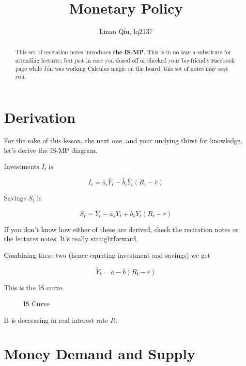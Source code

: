 \documentclass[11pt]{scrartcl}
\title{Monetary Policy}
\author{Linan Qiu, lq2137}
\newcommand{\jon}{J\'{o}n }
\newcommand{\og}{\ensuremath{\tilde{Y}}}
\begin{document}
\maketitle

\begin{abstract}
This set of recitation notes introduces \textbf{the IS-MP}. This is in no way a substitute for attending lectures, but just in case you dozed off or checked your boyfriend's Facebook page while \jon was working Calculus magic on the board, this set of notes may save you.
\end{abstract}

\section{Derivation}

For the sake of this lesson, the next one, and your undying thirst for knowledge, let's derive the IS-MP diagram.

Investments $I_t$ is

\[I_t = \bar{a}_i \bar{Y}_t - \bar{b}_i \bar{Y}_t (R_t - \bar{r}) \]

Savings $S_t$ is 

\[S_t = Y_t - \bar{a}_s\bar{Y}_t + \bar{b}_s\bar{Y}_t(R_t-r) \]

If you don't know how either of these are derived, check the recitation notes or the lectures notes. It's really straightforward.

Combining these two (hence equating investment and savings) we get

\[\og_t = \bar{a} - \bar{b} (R_t - \bar{r}) \]

This is the \color{blue}IS \color{black} curve.

\begin{figure}[H]
\centering
{}
\caption{\color{blue}IS Curve}
\end{figure}

It is decreasing in real interest rate $R_t$

\section{Money Demand and Supply}
\end{document}
